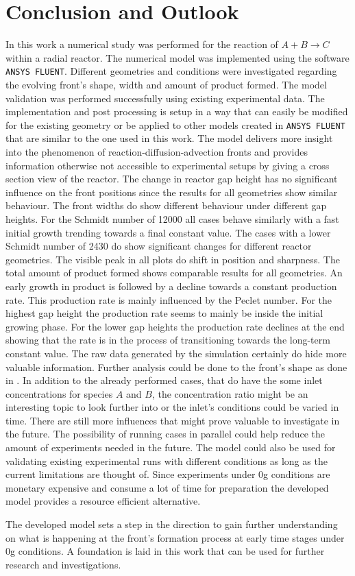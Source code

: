 \documentclass[../thesis.tex]{subfiles}
\begin{document}
\chapter{Conclusion and Outlook}
\label{chp:out_con}
In this work a numerical study was performed for the reaction of $A +B \rightarrow C$ within a radial reactor. The numerical model was implemented using the software \texttt{ANSYS FLUENT}. Different geometries and conditions were investigated regarding the evolving front's shape, width and amount of product formed. The model validation was performed successfully using existing experimental data.
The implementation and post processing is setup in a way that can easily be modified for the existing geometry or be applied to other models created in \texttt{ANSYS FLUENT} that are similar to the one used in this work. The model delivers more insight into the phenomenon of reaction-diffusion-advection fronts and provides information otherwise not accessible to experimental setups by giving a cross section view of the reactor.
The change in reactor gap height has no significant influence on the front positions since the results for all geometries show similar behaviour. The front widths do show different behaviour under different gap heights. For the Schmidt number of 12000 all cases behave similarly with a fast initial growth trending towards a final constant value. The cases with a lower Schmidt number of 2430 do show significant changes for different reactor geometries. The visible peak in all plots do shift in position and sharpness.  
The total amount of product formed shows comparable results for all geometries. An early growth in product is followed by a decline towards a constant production rate. This production rate is mainly influenced by the Peclet number. For the highest gap height the production rate seems to mainly be inside the initial growing phase. For the lower gap heights the production rate declines at the end showing that the rate is in the process of transitioning towards the long-term constant value.
The raw data generated by the simulation certainly do hide more valuable information. Further analysis could be done to the front's shape as done in \cite{perez2019upscaling, villermaux2012mixing}. 
In addition to the already performed cases, that do have the some inlet concentrations for species $A$ and $B$, the concentration ratio might be an interesting topic to look further into or the inlet's conditions could be varied in time. There are still more influences that might prove valuable to investigate in the future. 
The possibility of running cases in parallel could help reduce the amount of experiments needed in the future. The model could also be used for validating existing experimental runs with different conditions as long as the current limitations are thought of. Since experiments under 0g conditions are monetary expensive and consume a lot of time for preparation the developed model provides a resource efficient alternative.

The developed model sets a step in the direction to gain further understanding on what is happening at the front's formation process at early time stages under 0g conditions. A foundation is laid in this work that can be used for further research and investigations.
\end{document}
